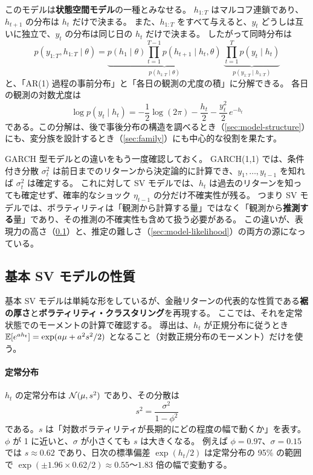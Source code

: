 このモデルは\textbf{状態空間モデル}の一種とみなせる。
$h_{1:T}$ はマルコフ連鎖であり、$h_{t+1}$ の分布は $h_t$ だけで決まる。
また、$h_{1:T}$ をすべて与えると、$y_t$ どうしは互いに独立で、$y_t$ の分布は同じ日の $h_t$ だけで決まる。
したがって同時分布は
\begin{equation}
  p(y_{1:T}, h_{1:T} \mid \theta)
  = \underbrace{p(h_1 \mid \theta) \prod_{t=1}^{T-1} p(h_{t+1} \mid h_t, \theta)}_{p(h_{1:T} \mid \theta)}
    \;\underbrace{\prod_{t=1}^{T} p(y_t \mid h_t)}_{p(y_{1:T} \mid h_{1:T})}
  \label{eq:sv-joint}
\end{equation}
と、「AR(1) 過程の事前分布」と「各日の観測の尤度の積」に分解できる。
各日の観測の対数尤度は
\begin{equation}
  \log p(y_t \mid h_t) = -\frac{1}{2}\log(2\pi) - \frac{h_t}{2} - \frac{y_t^2}{2}\,e^{-h_t}
  \label{eq:sv-loglik}
\end{equation}
である。この分解は、後で事後分布の構造を調べるとき（\cref{sec:model-structure}）にも、変分族を設計するとき（\cref{sec:family}）にも中心的な役割を果たす。

GARCH 型モデルとの違いをもう一度確認しておく。
GARCH(1,1) では、条件付き分散 $\sigma_t^2$ は前日までのリターンから決定論的に計算でき、$y_1, \dots, y_{t-1}$ を知れば $\sigma_t^2$ は確定する。
これに対して SV モデルでは、$h_t$ は過去のリターンを知っても確定せず、確率的なショック $\eta_{t-1}$ の分だけ不確実性が残る。
つまり SV モデルでは、ボラティリティは「観測から計算する量」ではなく「観測から\textbf{推測する}量」であり、その推測の不確実性も含めて扱う必要がある。
この違いが、表現力の高さ（\cref{sec:model-properties}）と、推定の難しさ（\cref{sec:model-likelihood}）の両方の源になっている。

\subsection{基本 SV モデルの性質}\label{sec:model-properties}

基本 SV モデルは単純な形をしているが、金融リターンの代表的な性質である\textbf{裾の厚さ}と\textbf{ボラティリティ・クラスタリング}を再現する。
ここでは、それを定常状態でのモーメントの計算で確認する。
導出は、$h_t$ が正規分布に従うとき $\mathbb{E}[e^{a h_t}] = \exp(a\mu + a^2 s^2/2)$ となること（対数正規分布のモーメント）だけを使う。

\paragraph{定常分布}
$h_t$ の定常分布は $\mathcal{N}(\mu, s^2)$ であり、その分散は
\[
  s^2 = \frac{\sigma^2}{1-\phi^2}
\]
である。$s$ は「対数ボラティリティが長期的にどの程度の幅で動くか」を表す。
$\phi$ が 1 に近いと、$\sigma$ が小さくても $s$ は大きくなる。
例えば $\phi = 0.97$、$\sigma = 0.15$ では $s \approx 0.62$ であり、日次の標準偏差 $\exp(h_t/2)$ は定常分布の 95\% の範囲で
$\exp(\pm 1.96 \times 0.62 / 2) \approx 0.55$〜$1.83$ 倍の幅で変動する。

